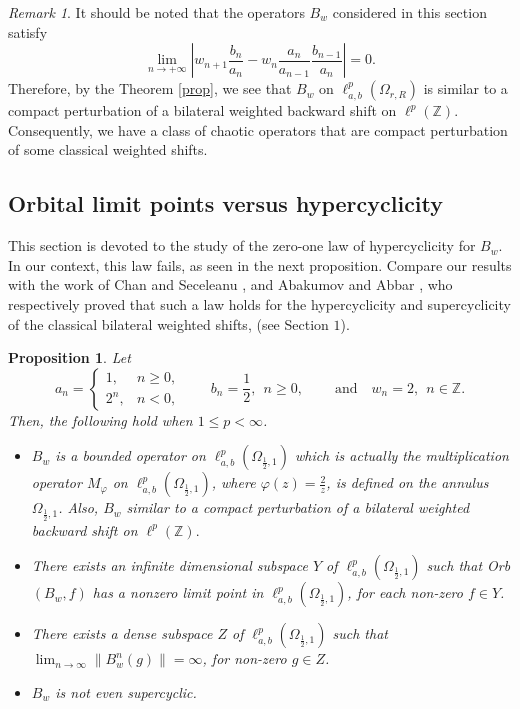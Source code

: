\documentclass[12pt, reqno]{amsart}
\newtheorem{proposition}[theorem]{Proposition}
\theoremstyle{definition}
\theoremstyle{remark}
\newtheorem{remark}[theorem]{Remark}
\numberwithin{equation}{section}
\begin{document}
\begin{remark}\label{compact-remark}
It should be noted that the operators $B_w$ considered in this section satisfy
\[
\lim_{ n \rightarrow +\infty} \left\lvert w_{n+1}\frac{b_{n}}{a_{n}}-w_{n}\frac{a_n}{a_{n-1}}\frac{b_{n-1}}{a_{n}}\right\rvert=0.
\]
Therefore, by the Theorem \ref{prop}, we see that $B_{w}$ on $\ell^p_{a,b}(\Omega_{r,R})$ is similar to a compact perturbation of a bilateral weighted backward shift on $\ell^{p}(\mathbb{Z}).$ Consequently, we have a class of chaotic operators that are compact perturbation of some classical weighted shifts.
\end{remark}

\subsection{Orbital limit points versus hypercyclicity}

This section is devoted to the study of the zero-one law of hypercyclicity for $B_w$. In our context, this law fails, as seen in the next proposition. Compare our results with the work of Chan and Seceleanu \cite{Kit1}, and Abakumov and Abbar \cite{Abakumov-Abbar}, who respectively proved that such a law holds for the hypercyclicity and supercyclicity of the classical bilateral weighted shifts, (see Section $1$).


\begin{proposition}\label{Not dense}
Let\[
a_n =
\begin{cases}
1, & n \ge 0,\\[4pt]
2^{n}, & n < 0,
\end{cases}
\qquad
b_n =\frac{1}{2}, ~~ n \ge 0,
\qquad~\text{and}\quad
w_n =2,  ~~ n \in \mathbb{Z}.
\]
 Then, the following hold when $1\leq p<\infty$.
 \begin{itemize}
 \item[(i)] $B_w$ is a bounded operator on $\ell^p_{a,b}(\Omega_{\frac{1}{2},1})$ which is actually the multiplication operator $M_{\varphi}$ on $\ell^p_{a,b}(\Omega_{\frac{1}{2},1})$, where $\varphi(z)=\frac{2}{z}$, is defined on the annulus $\Omega_{\frac{1}{2},1}$. Also, $B_w$ similar to a compact perturbation of a bilateral weighted backward shift on $\ell^{p}(\mathbb{Z}).$ 
 \item[(ii)] There exists an infinite dimensional subspace $Y$ of $\ell^p_{a,b}(\Omega_{\frac{1}{2},1})$ such that Orb$(B_{w},f)$ has a nonzero limit point in $\ell^p_{a,b}(\Omega_{\frac{1}{2},1})$, for each non-zero $f\in Y$.
 \item[(iii)] There exists a dense subspace $Z$ of $\ell^p_{a,b}(\Omega_{\frac{1}{2},1})$ such that $\lim_{n\rightarrow \infty}\|B_w^n(g)\|=\infty$, for non-zero $g\in Z$.
 \item[(iv)] $B_w$ is not even supercyclic.
 \end{itemize}
\end{proposition}
\end{document}
